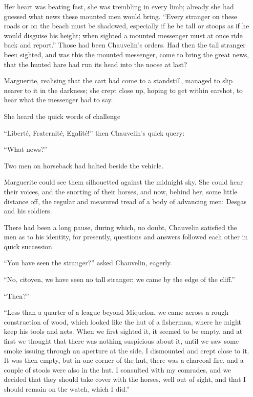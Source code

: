 Her heart was beating fast, she was trembling in every limb; already she had guessed what news these mounted men would bring. \enquote{Every stranger on these roads or on the beach must be shadowed, especially if he be tall or stoops as if he would disguise his height; when sighted a mounted messenger must at once ride back and report.} Those had been Chauvelin's orders. Had then the tall stranger been sighted, and was this the mounted messenger, come to bring the great news, that the hunted hare had run its head into the noose at last?

Marguerite, realising that the cart had come to a standstill, managed to slip nearer to it in the darkness; she crept close up, hoping to get within earshot, to hear what the messenger had to say.

She heard the quick words of challenge\longdash


\enquote{Liberté, Fraternité, Egalité!} then Chauvelin's quick query:\longdash


\enquote{What news?}

Two men on horseback had halted beside the vehicle.

Marguerite could see them silhouetted against the midnight sky. She could hear their voices, and the snorting of their horses, and now, behind her, some little distance off, the regular and measured tread of a body of advancing men: Desgas and his soldiers.

There had been a long pause, during which, no doubt, Chauvelin satisfied the men as to his identity, for presently, questions and answers followed each other in quick succession.

\enquote{You have seen the stranger?} asked Chauvelin, eagerly.

\enquote{No, citoyen, we have seen no tall stranger; we came by the edge of the cliff.}

\enquote{Then?}

\enquote{Less than a quarter of a league beyond Miquelon, we came across a rough construction of wood, which looked like the hut of a fisherman, where he might keep his tools and nets. When we first sighted it, it seemed to be empty, and at first we thought that there was nothing suspicious about it, until we saw some smoke issuing through an aperture at the side. I dismounted and crept close to it. It was then empty, but in one corner of the hut, there was a charcoal fire, and a couple of stools were also in the hut. I consulted with my comrades, and we decided that they should take cover with the horses, well out of sight, and that I should remain on the watch, which I did.}


